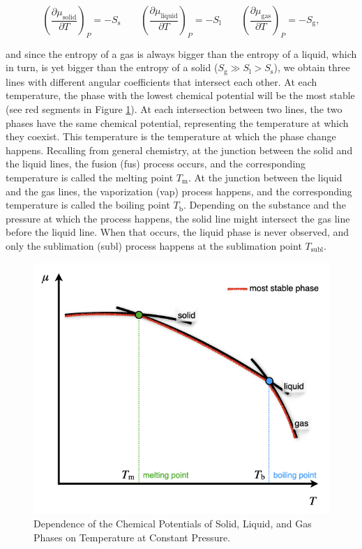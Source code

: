 \documentclass[
  9pt,
]{extbook}
\theoremstyle{definition}
\theoremstyle{definition}
\theoremstyle{definition}
\theoremstyle{remark}
\begin{document}
\begin{equation}
\left( \frac{\partial \mu_{\text{solid}}}{\partial T} \right)_P =-S_{\text{s}} \qquad \left( \frac{\partial \mu_{\text{liquid}}}{\partial T} \right)_P =-S_{\text{l}} \qquad \left( \frac{\partial \mu_{\text{gas}}}{\partial T} \right)_P =-S_{\text{g}},
\label{eq:muequal3}
\end{equation}

and since the entropy of a gas is always bigger than the entropy of a liquid, which in turn, is yet bigger than the entropy of a solid (\(S_{\text{g}} \gg S_{\text{l}}>S_{\text{s}}\)), we obtain three lines with different angular coefficients that intersect each other. At each temperature, the phase with the lowest chemical potential will be the most stable (see red segments in Figure \ref{fig:FigPhase1}). At each intersection between two lines, the two phases have the same chemical potential, representing the temperature at which they coexist. This temperature is the temperature at which the phase change happens. Recalling from general chemistry, at the junction between the solid and the liquid lines, the fusion (fus) process occurs, and the corresponding temperature is called the melting point \(T_{\text{m}}\). At the junction between the liquid and the gas lines, the vaporization (vap) process happens, and the corresponding temperature is called the boiling point \(T_{\text{b}}\). Depending on the substance and the pressure at which the process happens, the solid line might intersect the gas line before the liquid line. When that occurs, the liquid phase is never observed, and only the sublimation (subl) process happens at the sublimation point \(T_{\text{subl}}\).

\begin{figure}

{\centering \includegraphics[width=0.6\linewidth]{./img/OEP_Figures.016} 

}

\caption{Dependence of the Chemical Potentials of Solid, Liquid, and Gas Phases on Temperature at Constant Pressure.}\label{fig:FigPhase1}
\end{figure}
\end{document}
